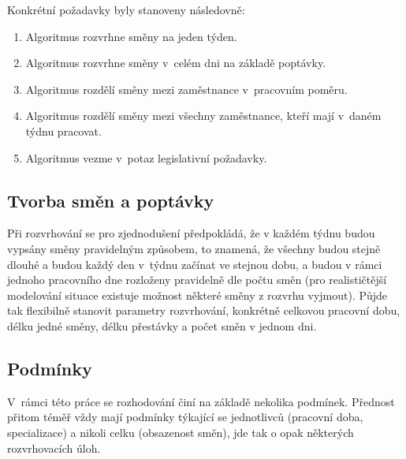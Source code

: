 \documentclass[twoside]{ctuthesis}
\begin{document}
Konkrétní požadavky byly stanoveny následovně:
\begin{enumerate}
	\item Algoritmus rozvrhne směny na jeden týden.
	\item Algoritmus rozvrhne směny v~celém dni na základě poptávky.
	\item Algoritmus rozdělí směny mezi zaměstnance v~pracovním poměru.
	\item Algoritmus rozdělí směny mezi všechny zaměstnance, kteří mají v~daném týdnu pracovat.
	\item Algoritmus vezme v~potaz legislativní požadavky.
\end{enumerate}

\subsection{Tvorba směn a poptávky}

Při rozvrhování se pro zjednodušení předpokládá, že v každém týdnu budou vypsány směny pravidelným způsobem, to znamená, že všechny budou stejně dlouhé a budou každý den v~týdnu začínat ve stejnou dobu, a budou v rámci jednoho pracovního dne rozloženy pravidelně dle počtu směn (pro realističtější modelování situace existuje možnost některé směny z rozvrhu vyjmout). Půjde tak flexibilně stanovit parametry rozvrhování, konkrétně celkovou pracovní dobu, délku jedné směny, délku přestávky a počet směn v jednom dni. 

\subsection{Podmínky}

V~rámci této práce se rozhodování činí na základě nekolika podmínek. Přednost přitom téměř vždy mají podmínky týkající se jednotlivců (pracovní doba, specializace) a nikoli celku (obsazenost směn), jde tak o opak některých rozvrhovacích úloh. \todo{}

\subsubsection{}
\end{document}
